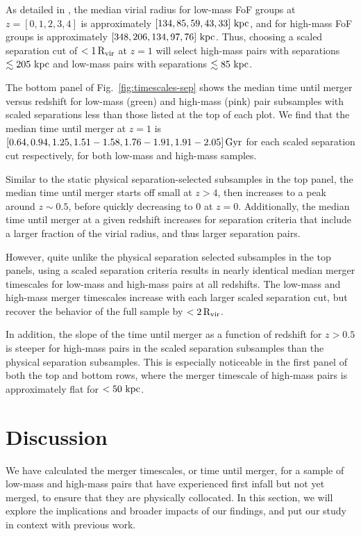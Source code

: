 \documentclass[twocolumn,linenumbers]{aastex631}
\newcommand{\kc}[1]{\textcolor{yellow}{\textbf{kc: #1}} }
\newcommand{\Rvir}{\ensuremath{\rm R_{vir}}}
\newcommand{\chambe}{\citet{Chamberlain2024}}
\begin{document}
    As detailed in \chambe{}, the median virial radius for low-mass FoF groups at $z=[0,1,2,3,4]$ is approximately $[134, 85, 59, 43, 33]\,\mathrm{\,kpc}$, and for high-mass FoF groups is approximately $[348, 206, 134, 97, 76]\,\mathrm{\,kpc}$.
    Thus, choosing a scaled separation cut of $<1\,\Rvir$ at $z=1$ will select high-mass pairs with separations $\lesssim205\,\mathrm{\,kpc}$ and low-mass pairs with separations $\lesssim85\,\mathrm{\,kpc}$.
    
    The bottom panel of Fig.~\ref{fig:timescales-sep} shows the median time until merger versus redshift for low-mass (green) and high-mass (pink) pair subsamples with scaled separations less than those listed at the top of each plot. 
    We find that the median time until merger at $z=1$ is $[0.64, 0.94,1.25,1.51-1.58,1.76-1.91,1.91-2.05]\,\mathrm{Gyr}$ for each scaled separation cut respectively, for both low-mass and high-mass samples. %
    
    Similar to the static physical separation-selected subsamples in the top panel, the median time until merger starts off small at $z>4$, then increases to a peak around $z\sim0.5$, before quickly decreasing to 0 at $z=0$. 
    Additionally, the median time until merger at a given redshift increases for separation criteria that include a larger fraction of the virial radius, and thus larger separation pairs. 
    
    However, quite unlike the physical separation selected subsamples in the top panels, using a scaled separation criteria results in nearly identical median merger timescales for low-mass and high-mass pairs at all redshifts.
    The low-mass and high-mass merger timescales increase with each larger scaled separation cut, but recover the behavior of the full sample by $<2\,\Rvir$.
    
    In addition, the slope of the time until merger as a function of redshift for $z>0.5$ is steeper for high-mass pairs in the scaled separation subsamples than the physical separation subsamples.
    This is especially noticeable in the first panel of both the top and bottom rows, where the merger timescale of high-mass pairs is approximately flat for $<50\,\mathrm{\,kpc}$. 



\section{Discussion} \label{sec:discussion}
We have calculated the merger timescales, or time until merger, for a sample of low-mass and high-mass pairs that have experienced first infall but not yet merged, to ensure that they are physically collocated.
In this section, we will explore the implications and broader impacts of our findings, and put our study in context with previous work. 
\end{document}
